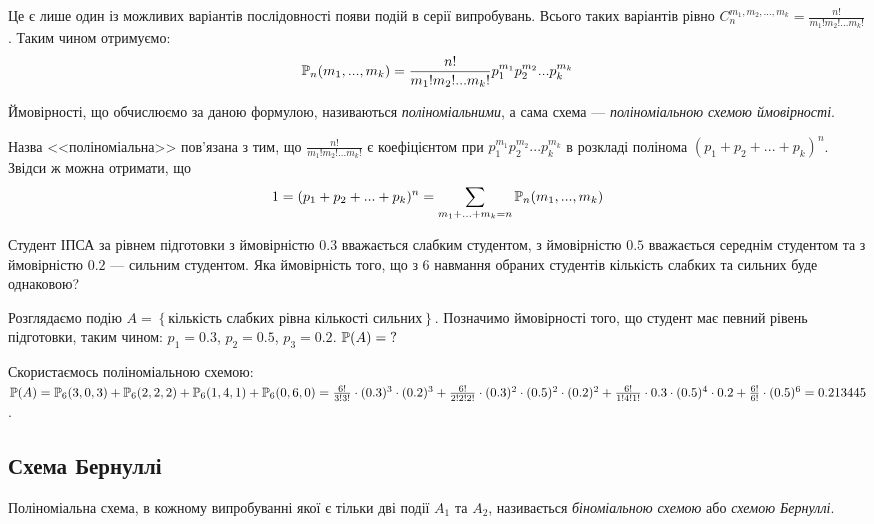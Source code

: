 Це є лише один із можливих варіантів послідовності появи подій в серії випробувань. Всього таких варіантів 
рівно $C_n^{m_1, m_2, ..., m_k} = \frac{n!}{m_1!m_2! ... m_k!}$. Таким чином отримуємо:
\begin{equation}\label{eq:poly_prob}
    \P_n(m_1, ..., m_k) = \frac{n!}{m_1!m_2! ... m_k!} p_1^{m_1} p_2^{m_2} ... p_k^{m_k}
\end{equation}
\begin{definition}
    Ймовірності, що обчислюємо за даною формулою, називаються \emph{поліноміальними}, а 
    сама схема --- \emph{поліноміальною схемою ймовірності}. 
\end{definition}
\begin{remark} Назва <<поліноміальна>> пов'язана з тим, що $\frac{n!}{m_1!m_2! ... m_k!}$
    є коефіцієнтом при $p_1^{m_1} p_2^{m_2} ... p_k^{m_k}$ в розкладі полінома $(p_1 + p_2 + ... + p_k)^n$.
    Звідси ж можна отримати, що
    $$1 = (p_1 + p_2 + ... + p_k)^n = \sum\limits_{m_1 + ... + m_k = n} \P_n(m_1, ..., m_k)$$
\end{remark}
\begin{example}
    Студент ІПСА за рівнем підготовки з ймовірністю $0.3$ вважається слабким студентом, 
    з ймовірністю $0.5$ вважається середнім студентом та 
    з ймовірністю $0.2$ --- сильним студентом. Яка ймовірність того, що з 6 навмання 
    обраних студентів кількість слабких та сильних буде однаковою?

    Розглядаємо подію $A = \left\{\text{кількість слабких рівна кількості сильних}\right\}$. 
    Позначимо ймовірності того, що студент має певний рівень підготовки, таким чином:
    $p_1 = 0.3$, $p_2 = 0.5$, $p_3 = 0.2$.
    $\P(A)=\text{?}$

    Скористаємось поліноміальною схемою:
    $\P(A) = \P_6(3, 0, 3) + \P_6(2, 2, 2) + \P_6(1, 4, 1) + \\ \P_6(0, 6, 0) = 
    \frac{6!}{3!3!}\cdot(0.3)^3 \cdot(0.2)^3 + \frac{6!}{2!2!2!}\cdot(0.3)^2 \cdot(0.5)^2 \cdot(0.2)^2 + 
    \frac{6!}{1!4!1!}\cdot0.3 \cdot(0.5)^4 \cdot 0.2 + \frac{6!}{6!} \cdot(0.5)^6 = 0.213445$.
\end{example}
\subsection{Схема Бернуллі}
\begin{definition}
    Поліноміальна схема, в кожному випробуванні якої є тільки дві події $A_1$ та $A_2$, 
    називається \emph{біноміальною схемою} або \emph{схемою Бернуллі}.
\end{definition}

